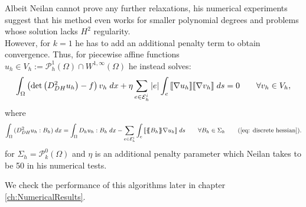 Albeit Neilan cannot prove any further relaxations, his numerical experiments suggest that his method even works for smaller polynomial degrees and problems whose solution lacks $H^2$ regularity. 
\\However, for $k=1$ he has to add an additional penalty term to obtain convergence. Thus, for piecewise affine functions $u_h \in V_h :=\mathcal P_h^1(\Omega) \cap W^{1,\infty}(\Omega)$ he instead solves:
\begin{align}
		\int_{\Omega} {{ \left(\det{\left(D_{DH}^2 u_h\right)} - f \right) v_h}\;dx} 
			+ \eta \sum_{e \in \mathcal{E}_h^i} |e| \int_{e} {{ \llbracket  \nabla u_h \rrbracket \llbracket \nabla v_h \rrbracket}\;ds}
		= 0 \qquad \forall v_h \in V_h, \label{eq: neilan eq1 + jump}
\end{align}
where
	\begin{align*}
		\myIntX  \Omega { (D_{DH}^2 u_h : B_h) }
		= \myIntX  \Omega { D_h u_h: B_h}
			 -\sum_{ e \in \edgesi} \myIntS e {  \jump {\average {B_h} \nabla u_h }}\qquad \forall B_h \in \Sigma_h \tag{\ref{eq: discrete hessian}}.
	\end{align*}
for $\Sigma_h = \mathcal P^0_k(\Omega)$ and $\eta$ is an additional penalty parameter which Neilan takes to be 50 in his numerical tests.

We check the performance of this algorithms later in chapter \ref{ch:NumericalResults}.
